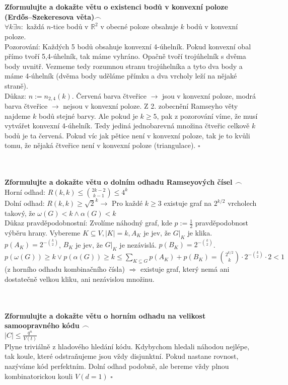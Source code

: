 \documentclass[a4paper]{article}
\newcommand{\fr}{$\frown$}
\newcommand{\led}{\hspace{0.2cm}$\square$}
\newcommand{\hlava}[1]{\text{} \\ \text{} \\ \text{} \hspace{-0.27cm} \textbf{#1} \\}
\begin{document}
\hlava{Zformulujte a dokažte větu o existenci bodů v konvexní poloze (Erdős–Szekeresova věta)\fr}
$\forall k \exists n: $ každá $n$-tice bodů v $\mathbb{R}^2$ v obecné poloze obsahuje $k$ bodů v konvexní poloze. \\
Pozorování: Každých 5 bodů obsahuje konvexní 4-úhelník. Pokud konvexní obal přímo tvoří 5,4-úhelník, tak máme vyhráno. Opačně tvoří trojúhelník s dvěma body uvnitř. Vezmeme tedy rozumnou stranu trojúhelníka a tyto dva body a máme 4-úhelník (dvěma body uděláme přímku a dva vrcholy leží na nějaké straně). \\
Důkaz: $n := n_{2,4}(k)$. Červená barva čtveřice $\rightarrow$ jsou v konvexní poloze, modrá barva čtveřice $\rightarrow$ nejsou v konvexní poloze. Z 2. zobecnění Ramseyho věty najdeme $k$ bodů stejné barvy. Ale pokud je $k \ge 5$, pak z pozorování víme, že musí vytvářet konvexní 4-úhelník. Tedy jediná jednobarevná množina čtveřic celkově $k$ bodů je ta červená. Pokud víc jak pětice není v konvexní poloze, tak je to kvůli tomu, že nějaká čtveřice není v konvexní poloze (triangulace). \led

\hlava{Zformulujte a dokažte větu o dolním odhadu Ramseyových čísel \fr}
Horní odhad: $R(k,k) \le { 2k-2 \choose k-1} \le 4^k$ \\
Dolní odhad: $R(k,k) \ge \sqrt{2}^k \rightarrow $ Pro každé $k \ge 3$ existuje graf na $2^{k/2}$ vrcholech takový, že $\omega(G) <k \wedge \alpha(G) < k$ \\
Důkaz pravděpodobnostní: Zvolíme náhodný graf, kde $p := \frac{1}{2}$ pravděpodobnost výběru hrany. Vybereme $K \subseteq V, |K| = k, A_K $ je jev, že $G|_K$ je klika. $p(A_K) = 2^{-{k \choose 2}}$, $B_K $ je jev, že $G|_K$ je nezávislá. $p(B_K) = 2^{-{k \choose 2}}$. $p(\omega(G)) \ge k \vee p(\alpha(G)) \ge k \le \sum_{K \subseteq G} p(A_K) + p(B_K) = { 2^{k/2} \choose k}\cdot 2^{- {k \choose 2}} \cdot 2 < 1$ (z horního odhadu kombinačního čísla) $\Rightarrow$ existuje graf, který nemá ani dostatečně velkou kliku, ani nezávislou množinu.

\hlava{Zformulujte a dokažte větu o horním odhadu na velikost samoopravného kódu \fr}
$|C| \le \frac{q^n}{V(t)}$ \\
Plyne triviálně z hladového hledání kódu. Kdybychom hledali náhodou nejlépe, tak koule, které odstraňujeme jsou vždy disjunktní. Pokud nastane rovnost, nazýváme kód perfektním. Dolní odhad podobně, ale bereme vždy plnou kombinatorickou kouli $ V(d=1) $ \led
\end{document}
